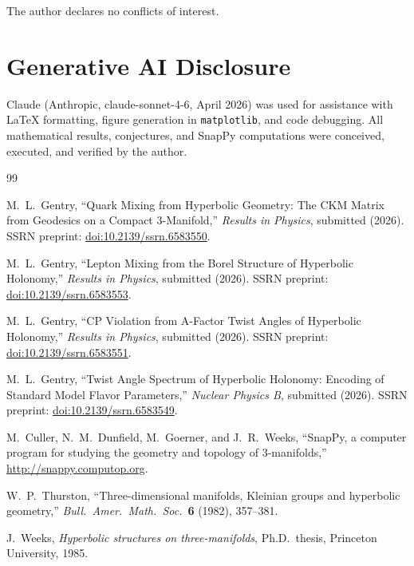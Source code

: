\documentclass[12pt]{article}
\theoremstyle{definition}
\begin{document}
The author declares no conflicts of interest.


\section*{Generative AI Disclosure}
Claude (Anthropic, claude-sonnet-4-6, April 2026) was used for
assistance with \LaTeX{} formatting, figure generation in
\texttt{matplotlib}, and code debugging. All mathematical results,
conjectures, and SnapPy computations were conceived, executed, and
verified by the author.

\begin{thebibliography}{99}

  M.~L.~Gentry,
  ``Quark Mixing from Hyperbolic Geometry: The CKM Matrix from Geodesics
  on a Compact 3-Manifold,''
  \textit{Results in Physics}, submitted (2026).
  SSRN preprint: \href{https://doi.org/10.2139/ssrn.6583550}
  {doi:10.2139/ssrn.6583550}.

  M.~L.~Gentry,
  ``Lepton Mixing from the Borel Structure of Hyperbolic Holonomy,''
  \textit{Results in Physics}, submitted (2026).
  SSRN preprint: \href{https://doi.org/10.2139/ssrn.6583553}
  {doi:10.2139/ssrn.6583553}.

  M.~L.~Gentry,
  ``CP Violation from A-Factor Twist Angles of Hyperbolic Holonomy,''
  \textit{Results in Physics}, submitted (2026).
  SSRN preprint: \href{https://doi.org/10.2139/ssrn.6583551}
  {doi:10.2139/ssrn.6583551}.

  M.~L.~Gentry,
  ``Twist Angle Spectrum of Hyperbolic Holonomy: Encoding of Standard
  Model Flavor Parameters,''
  \textit{Nuclear Physics B}, submitted (2026).
  SSRN preprint: \href{https://doi.org/10.2139/ssrn.6583549}
  {doi:10.2139/ssrn.6583549}.

  M.~Culler, N.~M.~Dunfield, M.~Goerner, and J.~R.~Weeks,
  ``SnapPy, a computer program for studying the geometry and topology
  of 3-manifolds,''
  \url{http://snappy.computop.org}.

  W.~P.~Thurston,
  ``Three-dimensional manifolds, Kleinian groups and hyperbolic
  geometry,''
  \textit{Bull.\ Amer.\ Math.\ Soc.}\ \textbf{6} (1982), 357--381.

  J.~Weeks,
  \textit{Hyperbolic structures on three-manifolds},
  Ph.D.\ thesis, Princeton University, 1985.

\end{thebibliography}
\end{document}
